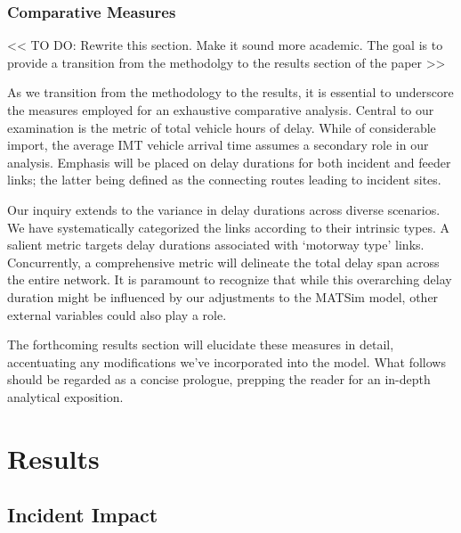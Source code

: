 \documentclass[
  letterpaper,
  authoryear]{elsarticle}
\begin{document}
\hypertarget{comparative-measures}{%
\subsubsection{Comparative Measures}\label{comparative-measures}}

\textless\textless{} TO DO: Rewrite this section. Make it sound more
academic. The goal is to provide a transition from the methodolgy to the
results section of the paper \textgreater\textgreater{}

As we transition from the methodology to the results, it is essential to
underscore the measures employed for an exhaustive comparative analysis.
Central to our examination is the metric of total vehicle hours of
delay. While of considerable import, the average IMT vehicle arrival
time assumes a secondary role in our analysis. Emphasis will be placed
on delay durations for both incident and feeder links; the latter being
defined as the connecting routes leading to incident sites.

Our inquiry extends to the variance in delay durations across diverse
scenarios. We have systematically categorized the links according to
their intrinsic types. A salient metric targets delay durations
associated with `motorway type' links. Concurrently, a comprehensive
metric will delineate the total delay span across the entire network. It
is paramount to recognize that while this overarching delay duration
might be influenced by our adjustments to the MATSim model, other
external variables could also play a role.

The forthcoming results section will elucidate these measures in detail,
accentuating any modifications we've incorporated into the model. What
follows should be regarded as a concise prologue, prepping the reader
for an in-depth analytical exposition.


\hypertarget{results}{%
\section{Results}\label{results}}

\hypertarget{incident-impact}{%
\subsection{Incident Impact}\label{incident-impact}}
\end{document}
